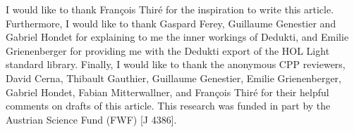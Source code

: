 \documentclass[screen,sigplan,10pt]{acmart}
\begin{document}
\begin{acks}
I would like to thank François Thiré for the inspiration to write this
article. Furthermore, I would like to thank Gaspard Ferey, Guillaume
Genestier and Gabriel Hondet for explaining to me the inner workings of
Dedukti, and Emilie Grienenberger for providing me with the Dedukti
export of the HOL Light standard library. Finally, I would like to thank
the anonymous CPP reviewers, David Cerna, Thibault Gauthier, Guillaume
Genestier, Emilie Grienenberger, Gabriel Hondet, Fabian Mitterwallner,
and François Thiré for their helpful comments on drafts of this article.
This research was funded in part by the Austrian Science Fund (FWF) {[}J
4386{]}.
\end{acks}

\balance


\end{document}

